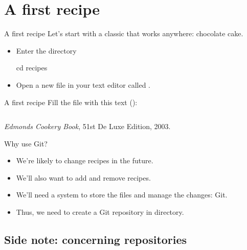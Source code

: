 \documentclass{git_course}
\begin{document}
\section{A first recipe}

\begin{frame}[fragile]{A first recipe}
    Let's start with a classic that works anywhere: chocolate cake.

    \begin{itemize}
        \item Enter the  directory
        \begin{shellcode}
            cd recipes
        \end{shellcode}
        \item Open a new file in your text editor called .
    \end{itemize}
\end{frame}

\begin{frame}[fragile]{A first recipe}
    Fill the file with this text
    (\href{https://raw.githubusercontent.com/paultcochrane/git_course/refs/heads/master/git/examples/edmonds-chocolate-cake.md}{}):
    \inputminted[fontsize=\tiny]{markdown}{examples/edmonds-chocolate-cake.md}
    {\footnotesize \emph{Edmonds Cookery Book}, 51st De Luxe Edition, 2003.}
\end{frame}

\begin{frame}{Why use Git?}
    \begin{itemize}
        \item We're likely to change recipes in the future.
        \item We'll also want to add and remove recipes.
        \item We'll need a system to store the files and manage the changes: Git.
        \item Thus, we need to create a Git repository in
             directory.
    \end{itemize}
\end{frame}

\subsection{Side note: concerning repositories}
\end{document}
